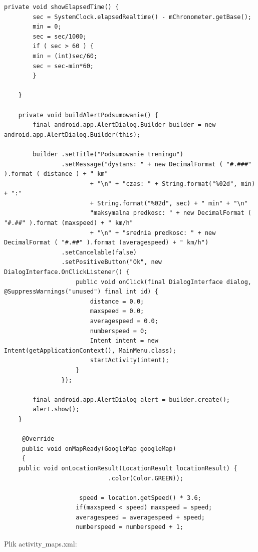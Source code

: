 \documentclass[a4paper]{article}
\begin{document}
\begin{lstlisting}[style=java]
    private void showElapsedTime() {
        sec = SystemClock.elapsedRealtime() - mChronometer.getBase();
        min = 0;
        sec = sec/1000;
        if ( sec > 60 ) {
        min = (int)sec/60;
        sec = sec-min*60;
        }

    }

    private void buildAlertPodsumowanie() {
        final android.app.AlertDialog.Builder builder = new android.app.AlertDialog.Builder(this);

        builder .setTitle("Podsumowanie treningu")
                .setMessage("dystans: " + new DecimalFormat ( "#.###" ).format ( distance ) + " km"
                        + "\n" + "czas: " + String.format("%02d", min) + ":"
                        + String.format("%02d", sec) + " min" + "\n"
                        "maksymalna predkosc: " + new DecimalFormat ( "#.##" ).format (maxspeed) + " km/h"
                        + "\n" + "srednia predkosc: " + new DecimalFormat ( "#.##" ).format (averagespeed) + " km/h")
                .setCancelable(false)
                .setPositiveButton("Ok", new DialogInterface.OnClickListener() {
                    public void onClick(final DialogInterface dialog, @SuppressWarnings("unused") final int id) {
                        distance = 0.0;
                        maxspeed = 0.0;
                        averagespeed = 0.0;
                        numberspeed = 0;
                        Intent intent = new Intent(getApplicationContext(), MainMenu.class);
                        startActivity(intent);
                    }
                });

        final android.app.AlertDialog alert = builder.create();
        alert.show();
    }

     @Override
     public void onMapReady(GoogleMap googleMap)
     {
    public void onLocationResult(LocationResult locationResult) {
                             .color(Color.GREEN));
 
                     speed = location.getSpeed() * 3.6;
                    if(maxspeed < speed) maxspeed = speed;
                    averagespeed = averagespeed + speed;
                    numberspeed = numberspeed + 1;
\end{lstlisting}
Plik activity\verb|_|maps.xml:
\end{document}
